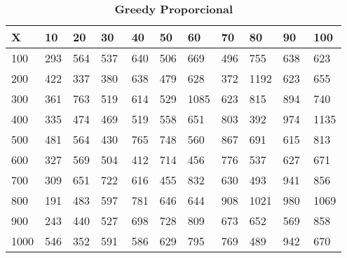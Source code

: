 \documentclass[10pt,letterpaper]{article}
\begin{document}
\begin{center}
\begin{table}\renewcommand{\arraystretch}{2.5}
\caption{\large \textbf{Greedy Proporcional}}
\centering
\begin{tabular} { |m{0.5cm}|m{1.3cm}|m{1.3cm}|m{1.3cm}|m{1.3cm}|m{1.3cm}|m{1.3cm}|m{1.3cm}|m{1.3cm}|m{1.3cm}|m{1.3cm}|} 
\hline
\rowcolor{Gray}
\centering \textbf{X} & \centering \textbf{10} & \centering \textbf{20} & \centering \textbf{30}\ & \centering \textbf{40} & \centering \textbf{50} & \centering \textbf{60}\ & \centering \textbf{70} & \centering \textbf{80} & \centering \textbf{90}\ & \textbf{100} \\\hline
\cellcolor{Gray}100 & \Large 293 & \Large 564 & \Large 537 & \Large 640 & \Large 506 & \Large 669 & \Large 496 & \Large 755 & \Large 638 & \Large 623 \\
\hline
\cellcolor{Gray}200 & \Large 422 & \Large 337 & \Large 380 & \Large 638 & \Large 479 & \Large 628 & \Large 372 & \Large 1192 & \Large 623 & \Large 655 \\
\hline
\cellcolor{Gray}300 & \Large 361 & \Large 763 & \Large 519 & \Large 614 & \Large 529 & \Large 1085 & \Large 623 & \Large 815 & \Large 894 & \Large 740 \\
\hline
\cellcolor{Gray}400 & \Large 335 & \Large 474 & \Large 469 & \Large 519 & \Large 558 & \Large 651 & \Large 803 & \Large 392 & \Large 974 & \Large 1135 \\
\hline
\cellcolor{Gray}500 & \Large 481 & \Large 564 & \Large 430 & \Large 765 & \Large 748 & \Large 560 & \Large 867 & \Large 691 & \Large 615 & \Large 813 \\
\hline
\cellcolor{Gray}600 & \Large 327 & \Large 569 & \Large 504 & \Large 412 & \Large 714 & \Large 456 & \Large 776 & \Large 537 & \Large 627 & \Large 671 \\
\hline
\cellcolor{Gray}700 & \Large 309 & \Large 651 & \Large 722 & \Large 616 & \Large 455 & \Large 832 & \Large 630 & \Large 493 & \Large 941 & \Large 856 \\
\hline
\cellcolor{Gray}800 & \Large 191 & \Large 483 & \Large 597 & \Large 781 & \Large 646 & \Large 644 & \Large 908 & \Large 1021 & \Large 980 & \Large 1069 \\
\hline
\cellcolor{Gray}900 & \Large 243 & \Large 440 & \Large 527 & \Large 698 & \Large 728 & \Large 809 & \Large 673 & \Large 652 & \Large 569 & \Large 858 \\
\hline
\cellcolor{Gray}1000 & \Large 546 & \Large 352 & \Large 591 & \Large 586 & \Large 629 & \Large 795 & \Large 769 & \Large 489 & \Large 942 & \Large 670 \\
\hline
\end{tabular} \\
\end{table}
\end{center}
\end{document}

